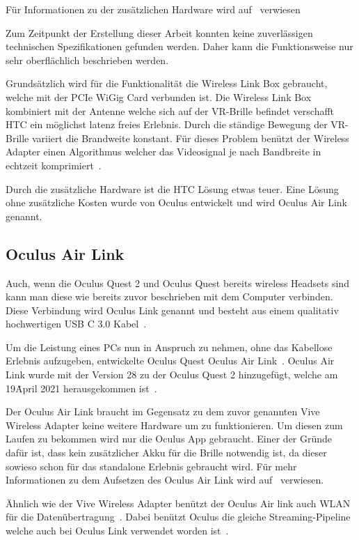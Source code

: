 Für Informationen zu der zusätzlichen Hardware wird auf~\cite{ViveWirelessAdapter} verwiesen

Zum Zeitpunkt der Erstellung dieser Arbeit konnten keine zuverlässigen technischen Spezifikationen gefunden werden.
Daher kann die Funktionsweise nur sehr oberflächlich beschrieben werden.

Grundsätzlich wird für die Funktionalität die Wireless Link Box gebraucht, welche mit der PCIe WiGig Card verbunden ist.
Die Wireless Link Box kombiniert mit der Antenne welche sich auf der VR-Brille befindet verschafft HTC ein möglichst latenz freies Erlebnis.
Durch die ständige Bewegung der VR-Brille variiert die Brandweite konstant.
Für dieses Problem benützt der Wireless Adapter einen Algorithmus welcher das Videosignal je nach Bandbreite in echtzeit komprimiert~\cite{VRConduit_2018}.

Durch die zusätzliche Hardware ist die HTC Lösung etwas teuer.
Eine Lösung ohne zusätzliche Kosten wurde von Oculus entwickelt und wird Oculus Air Link genannt.

\subsection{Oculus Air Link}

Auch, wenn die Oculus Quest 2 und Oculus Quest bereits wireless Headsets sind kann man diese wie bereits zuvor beschrieben mit dem Computer verbinden.
Diese Verbindung wird Oculus Link genannt und besteht aus einem qualitativ hochwertigen USB C 3.0 Kabel~\cite{William_2020}.

Um die Leistung eines PCs nun in Anspruch zu nehmen, ohne das Kabellose Erlebnis aufzugeben, entwickelte Oculus Quest Oculus Air Link~\cite{Oculus_2021}.
Oculus Air Link wurde mit der Version 28 zu der Oculus Quest 2 hinzugefügt, welche am 19\. April 2021 herausgekommen ist~\cite{Oculus_2021, oculus_patchnotes}.

Der Oculus Air Link braucht im Gegensatz zu dem zuvor genannten Vive Wireless Adapter keine weitere Hardware um zu funktionieren.
Um diesen zum Laufen zu bekommen wird nur die Oculus App gebraucht.
Einer der Gründe dafür ist, dass kein zusätzlicher Akku für die Brille notwendig ist, da dieser sowieso schon für das standalone Erlebnis gebraucht wird.
Für mehr Informationen zu dem Aufsetzen des Oculus Air Link wird auf~\cite{Oculus_AirLink} verwiesen.

Ähnlich wie der Vive Wireless Adapter benützt der Oculus Air link auch WLAN für die Datenübertragung~\cite{Oculus_2021}.
Dabei benützt Oculus die gleiche Streaming-Pipeline welche auch bei Oculus Link verwendet worden ist~\cite{Oculus_2021}.
